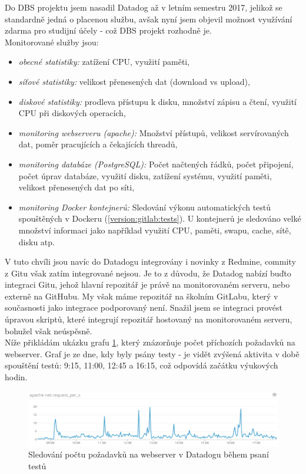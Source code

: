 Do DBS projektu jsem nasadil Datadog až v letním semestru 2017, jelikož se standardně jedná o placenou službu, avšak nyní jsem objevil možnost využívání zdarma pro studijní účely - což DBS projekt rozhodně je.\\
Monitorované služby jsou:
\begin{itemize}
	\item \emph{obecné statistiky:} zatížení CPU, využití paměti,
	\item \emph{síťové statistiky:} velikost přenesených dat (download vs upload),
	\item \emph{diskové statistiky:} prodleva přístupu k disku, množství zápisu a čtení, využití CPU při diskových operacích,
	\item \emph{monitoring webserveru (apache):} Množství přístupů, velikost servírovaných dat, poměr pracujících a čekajících threadů,
	\item \emph{monitoring databáze (PostgreSQL):} Počet načtených řádků, počet připojení, počet úprav databáze, využití disku, zatížení systému, využití paměti, velikost přenesených dat po síti,
	\item \emph{monitoring Docker kontejnerů:} Sledování výkonu automatických testů spouštěných v Dockeru (\ref{version:gitlab:tests}). U kontejnerů je sledováno velké množství informaci jako například využití CPU, paměti, swapu, cache, sítě, disku atp.
\end{itemize}
V tuto chvíli jsou navíc do Datadogu integrovány i novinky z Redmine, commity z Gitu však zatím integrované nejsou. Je to z důvodu, že Datadog nabízí buďto integraci Gitu, jehož hlavní repozitář je právě na monitorovaném serveru, nebo externě na GitHubu. My však máme repozitář na školním GitLabu, který v současnosti jako integrace podporovaný není. Snažil jsem se integraci provést úpravou skriptů, které integrují repozitář hostovaný na monitorovaném serveru, bohužel však neúspěsně.\\
Níže přikládám ukázku grafu \ref{picture:datadog-apache}, který znázorňuje počet příchozích požadavků na webserver. Graf je ze dne, kdy byly psány testy - je vidět zvýšená aktivita v době spouštění testů: 9:15, 11:00, 12:45 a 16:15, což odpovídá začátku výukových hodin.\\
\begin{figure}[H]
\includegraphics[width=\textwidth]{../png/datadog-apache.png}
\caption{Sledování počtu požadavků na webserver v Datadogu během psaní testů} \label{picture:datadog-apache}
\end{figure}
